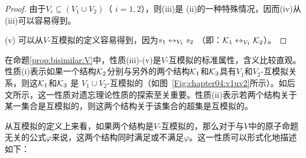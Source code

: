 \begin{proof}
	由于$V_i \subseteq (V_1 \cup V_2)$（ $i = 1, 2$），则(iii)是 (ii)的一种特殊情况，因而(iv)从(iii)可以容易得到。
	
	(v) 可以从$V$-互模拟的定义容易得到，因为$s_1 \leftrightarrow_{V_1} s_2$ （即：${\cal K}_1\leftrightarrow_{V_1}{\cal K}_2$）。	
\end{proof}


在命题\ref{prop:bisimilar:V}中，性质(iii)-(v)是$V$-互模拟的标准属性，含义比较直观。性质(i)表示如果一个结构${\cal K}_2$分别与另外的两个结构${\cal K}_1$和${\cal K}_3$具有$V_1$和$V_2$-互模拟关系，则这${\cal K}_1$和${\cal K}_3$ 是 $V_1\cup V_2$-互模拟的（如图~\ref{Fig:chapter04:v1uv2}所示）。如后文所示，这一性质对遗忘理论性质的探索至关重要。性质(ii)表示若两个结构关于某一集合是互模拟的，则这两个结构关于该集合的超集是互模拟的。

从互模拟的定义上来看，如果两个结构是$V$-互模拟的，那么对于与$V$中的原子命题无关的公式$\varphi$来说，这两个结构同时满足或不满足$\varphi$。这一性质可以形式化地描述如下：

